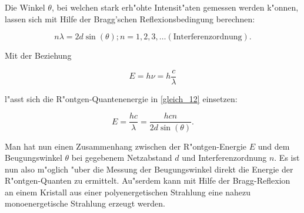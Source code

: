 	Die Winkel $\theta$, bei welchen stark erh"ohte Intensit"aten gemessen werden k"onnen, lassen sich mit Hilfe der Bragg'schen Reflexionsbedingung berechnen:

	\begin{equation}
		n \lambda = 2 d \sin(\theta); n = 1,2,3,\ldots (\text{Interferenzordnung}). \label{gleich_12}
	\end{equation}

	Mit der Beziehung

	\begin{equation}
		E = h \nu = h \frac{c}{\lambda}
	\end{equation}

	l"asst sich die R"ontgen-Quantenenergie in \eqref{gleich_12} einsetzen:

	\begin{equation}
		E = \frac{hc}{\lambda} = \frac{hcn}{2d\sin(\theta)}. \label{gleich_13}
	\end{equation}

	Man hat nun einen Zusammenhang zwischen der R"ontgen-Energie $E$ und dem Beugungswinkel $\theta$ bei gegebenem Netzabstand $d$ und Interferenzordnung $n$.
	Es ist nun also m"oglich "uber die Messung der Beugungswinkel direkt die Energie der R"ontgen-Quanten zu ermittelt. 
	Au"serdem kann mit Hilfe der Bragg-Reflexion an einem Kristall aus einer polyenergetischen Strahlung eine nahezu monoenergetische Strahlung erzeugt werden.